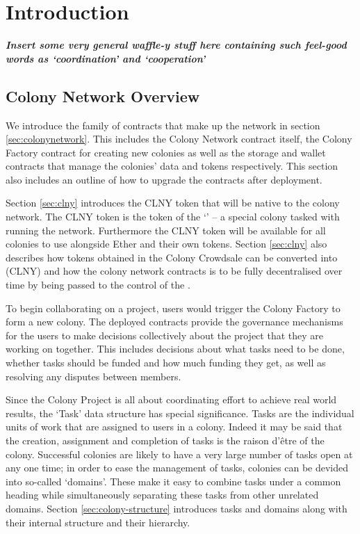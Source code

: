 \section{Introduction}


\textbf{\emph{Insert some very general waffle-y stuff here containing such feel-good words as `coordination' and `cooperation'}}

\subsection{Colony Network Overview}


We introduce the family of contracts that make up the network in section \ref{sec:colonynetwork}. This includes the Colony Network contract itself, the Colony Factory contract for creating new colonies as well as the storage and wallet contracts that manage the colonies' data and tokens respectively. This section also includes an outline of how to upgrade the contracts after deployment.

Section \ref{sec:clny} introduces the CLNY token that will be native to the colony network. The CLNY token is the token of the `\rc' -- a special colony tasked with running the network. Furthermore the CLNY token will be available for all colonies to use alongside Ether and their own tokens. Section \ref{sec:clny} also describes how tokens obtained in the Colony Crowdsale can be converted into \rcts (CLNY) and how the colony network contracts is to be fully decentralised over time by being passed to the control of the \rc.

To begin collaborating on a project, users would trigger the Colony Factory to form a new colony. The deployed contracts provide the governance mechanisms for the users to make decisions collectively about the project that they are working on together. This includes decisions about what tasks need to be done, whether tasks should be funded and how much funding they get, as well as resolving any disputes between members.

Since the Colony Project is all about coordinating effort to achieve real world results, the `Task' data structure has special significance. Tasks are the individual units of work that are assigned to  users in a colony. Indeed it may be said that the creation, assignment and completion of tasks is the raison d'être of the colony. Successful colonies are likely to have a very large number of tasks open at any one time; in order to ease the management of tasks, colonies can be devided into so-called `domains'. These make it easy to combine tasks under a common heading while simultaneously separating these tasks from other unrelated domains. Section \ref{sec:colony-structure} introduces tasks and domains along with their internal structure and their hierarchy.

